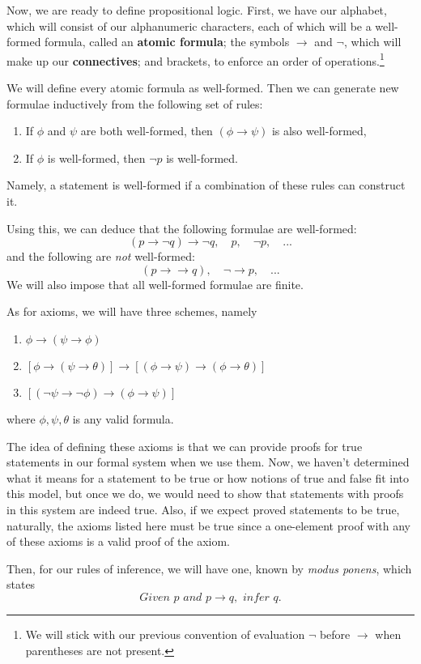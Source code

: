 Now, we are ready to define propositional logic.
First, we have our alphabet, which will consist of our alphanumeric characters, each of which will be a well-formed formula, called an \textbf{atomic formula};
the symbols $\to$ and $\neg$, which will make up our \textbf{connectives};
and brackets, to enforce an order of operations.\footnote{
We will stick with our previous convention of evaluation $\neg$ before $\to$ when parentheses are not present.}

We will define every atomic formula as well-formed.
Then we can generate new formulae inductively from the following set of rules:
\begin{enumerate}
	\item If $\phi$ and $\psi$ are both well-formed, then $(\phi\to \psi)$ is also well-formed,
	\item If $\phi$ is well-formed, then $\neg p$ is well-formed.
\end{enumerate}
Namely, a statement is well-formed if a combination of these rules can construct it.

Using this, we can deduce that the following formulae are well-formed:
$$(p \to \neg q) \to \neg q, \quad p, \quad \neg p, \quad ...$$
and the following are \textit{not} well-formed:
$$(p \to \to q), \quad \neg \to p, \quad ...$$
We will also impose that all well-formed formulae are finite.

As for axioms, we will have three schemes, namely
\begin{enumerate}[label=(A\arabic*), leftmargin=4em]
	\item $\phi \to (\psi \to \phi)$
	\item $[\phi \to (\psi \to \theta)] \to [(\phi \to  \psi) \to (\phi \to \theta)]$
	\item $[(\neg \psi \to \neg \phi) \to (\phi \to \psi)]$
\end{enumerate}
where $\phi, \psi, \theta$ is any valid formula.

The idea of defining these axioms is that we can provide proofs for true statements in our formal system when we use them.
Now, we haven't determined what it means for a statement to be true or how notions of true and false fit into this model, but once we do, we would need to show that statements with proofs in this system are indeed true.
Also, if we expect proved statements to be true, naturally, the axioms listed here must be true since a one-element proof with any of these axioms is a valid proof of the axiom.

Then, for our rules of inference, we will have one, known by \textit{modus ponens}, which states
$$\textit{Given } p \textit{ and } p \to q, \textit{ infer } q.$$

